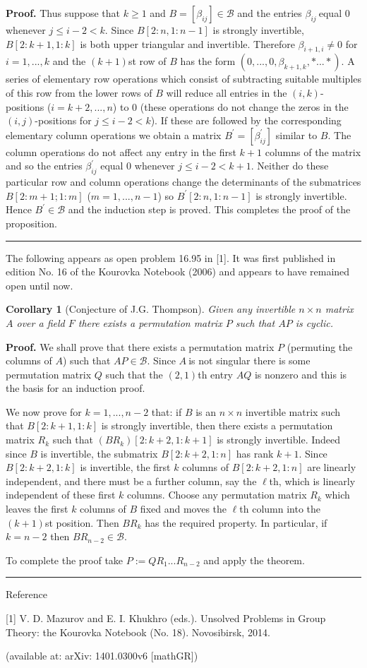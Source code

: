 \documentclass{article}%
\newtheorem{corollary}[theorem]{Corollary}
\newenvironment{proof}[1][Proof]{\noindent\textbf{#1.} }{\ \rule{0.5em}{0.5em}}
\begin{document}
\begin{proof}
Thus suppose that $k\geq1$ and $B=[\beta_{ij}]\in\mathcal{B}$ and the entries
$\beta_{ij}\ $equal $0$ whenever $j\leq i-2<k$. Since $B[2:n,1:n-1]$ is
strongly invertible, $B[2:k+1,1:k]$ is both upper triangular and invertible.
Therefore $\beta_{i+1,i}\neq0$ for $i=1,...,k$ and the $(k+1)$st row of $B$
has the form $(0,...,0,\beta_{k+1,k},\ast...\ast)$. A series of elementary row
operations which consist of subtracting suitable multiples of this row from
the lower rows of $B$ will reduce all entries in the $(i,k)$-positions
($i=k+2,...,n$) to $0$ (these operations do not change the zeros in the
$(i,j)$-positions for $j\leq i-2<k$). If these are followed by the
corresponding elementary column operations we obtain a matrix $B^{\prime
}=[\beta_{ij}^{\prime}]$ similar to $B$. The column operations do not affect
any entry in the first $k+1$ columns of the matrix and so the entries
$\beta_{ij}^{\prime}$ equal $0$ whenever $j\leq i-2<k+1$. Neither do these
particular row and column operations change the determinants of the
submatrices $B[2:m+1;1:m]$ ($m=1,...,n-1$) so $B^{\prime}[2:n,1:n-1]$ is
strongly invertible. Hence $B^{\prime}\in\mathcal{B}$ and the induction step
is proved. This completes the proof of the proposition.
\end{proof}

The following appears as open problem 16.95 in [1]. It was first published in
edition No. 16 of the Kourovka Notebook (2006) and appears to have remained
open until now.

\begin{corollary}
[Conjecture of J.G. Thompson]Given any invertible $n\times n$ matrix $A$ over
a field $F$ there exists a permutation matrix $P$ such that $AP$ is cyclic.
\end{corollary}

\begin{proof}
We shall prove that there exists a permutation matrix $P$ (permuting the
columns of $A$) such that $AP\in\mathcal{B}$. Since $A\ $is not singular there
is some permutation matrix $Q$ such that the $(2,1)$th entry $AQ$ is nonzero
and this is the basis for an induction proof.

We now prove for $k=1,...,n-2$ that: if $B$ is an $n\times n$ invertible
matrix such that $B[2:k+1,1:k]$ is strongly invertible, then there exists a
permutation matrix $R_{k}$ such that $(BR_{k})[2:k+2,1:k+1]$ is strongly
invertible. Indeed since $B$ is invertible, the submatrix $B[2:k+2,1:n]$ has
rank $k+1$. Since $B[2:k+2,1:k]$ is invertible, the first $k$ columns of
$B[2:k+2,1:n]$ are linearly independent, and there must be a further column,
say the $\ell$th, which is linearly independent of these first $k$ columns.
Choose any permutation matrix $R_{k}$ which leaves the first $k$ columns of
$B$ fixed and moves the $\ell$th column into the $(k+1)$st position. Then
$BR_{k}$ has the required property. In particular, if $k=n-2$ then
$BR_{n-2}\in\mathcal{B}$.

To complete the proof take $P:=QR_{1}...R_{n-2}$ and apply the theorem.
\end{proof}

\bigskip

{\large Reference}

[1] V. D. Mazurov and E. I. Khukhro (eds.). Unsolved Problems in Group Theory:
the Kourovka Notebook (No. 18). Novosibirsk, 2014.

\qquad\qquad(available at: arXiv: 1401.0300v6 [mathGR])
\end{document}
